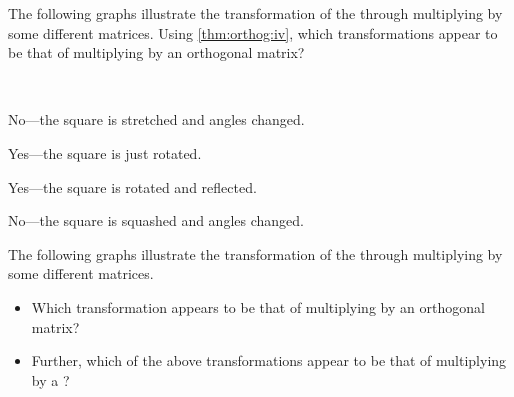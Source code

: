 \begin{example} \label{eg:}
The following graphs illustrate the transformation of the  through multiplying by some different matrices. 
Using \autoref{thm:orthog:iv}, which transformations appear to be that of multiplying by an orthogonal matrix?
\begin{parts}
\item {}
\item {}
\item {}
\item {}
\end{parts}

\begin{solution} \ 
\begin{parts}
\item No---the square is stretched and angles changed.
\item Yes---the square is just rotated.
\item Yes---the square is rotated and reflected.
\item No---the square is squashed and angles changed.
\end{parts}
\end{solution}
\end{example}




\begin{activity}
The following graphs illustrate the transformation of the  through multiplying by some different matrices. 
\begin{itemize}
\item Which transformation appears to be that of multiplying by an orthogonal matrix?
\actposs{\TwoD{-0.85}{-0.52}{-0.52}{0.85}}
{}
{}
{}
\item Further, which of the above transformations appear to be that of multiplying by a ?
\end{itemize}
\end{activity}





